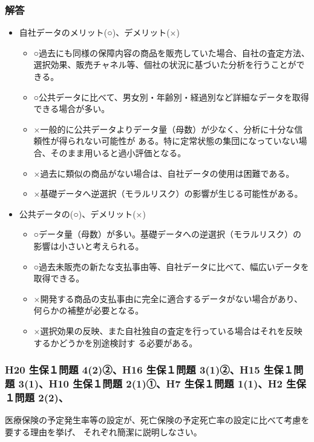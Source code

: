 \documentclass[report,gutter=10mm,fore-edge=10mm,uplatex,dvipdfmx]{jlreq}
\begin{document}
\subsubsection{解答}
\begin{itemize}
 \item 自社データのメリット(○)、デメリット(×)
\begin{itemize}
 \item ○過去にも同様の保障内容の商品を販売していた場合、自社の査定方法、選択効果、販売チャネル等、個社の状況に基づいた分析を行うことができる。
 \item ○公共データに比べて、男女別・年齢別・経過別など詳細なデータを取得できる場合が多い。
 \item ×一般的に公共データよりデータ量（母数）が少なく、分析に十分な信頼性が得られない可能性が
ある。特に定常状態の集団になっていない場合、そのまま用いると過小評価となる。
 \item ×過去に類似の商品がない場合は、自社データの使用は困難である。
 \item ×基礎データへ逆選択（モラルリスク）の影響が生じる可能性がある。
\end{itemize}
 \item 公共データの(○)、デメリット(×)
\begin{itemize}
 \item ○データ量（母数）が多い。基礎データへの逆選択（モラルリスク）の影響は小さいと考えられる。
 \item ○過去未販売の新たな支払事由等、自社データに比べて、幅広いデータを取得できる。
 \item ×開発する商品の支払事由に完全に適合するデータがない場合があり、何らかの補整が必要となる。
 \item ×選択効果の反映、また自社独自の査定を行っている場合はそれを反映するかどうかを別途検討す
る必要がある。
\end{itemize}
\end{itemize}

\subsubsection{H20 生保１問題 4(2)②、H16 生保１問題 3(1)②、H15 生保１問題 3(1)、H10 生保１問題 2(1)①、H7 生保１問題 1(1)、H2 生保１問題 2(2)、}
医療保険の予定発生率等の設定が、死亡保険の予定死亡率の設定に比べて考慮を要する理由を挙げ、
それぞれ簡潔に説明しなさい。
\end{document}
